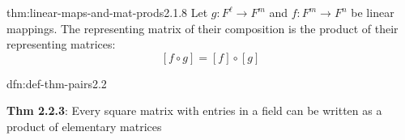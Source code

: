 \documentclass[landscape, 8pt]{extarticle}
\begin{document}
\begin{multicols}{3}
\begin{thm}{thm:linear-maps-and-mat-prods}{2.1.8}
    Let $g : F^{\ell}\to F^{m}$ and $f : F^{m} \to F^{n}$ be linear mappings. The representing matrix of their composition is the product of their representing matrices:
    \[[f \circ g] = [f] \circ [g]\]
    
\end{thm}



\begin{dfn}{dfn:def-thm-pairs}{2.2}

    \vspace{-5pt}

    \textbf{Thm 2.2.3}: Every square matrix with entries in a field can be written as a product of elementary matrices


\end{dfn}
\end{multicols}
\end{document}
